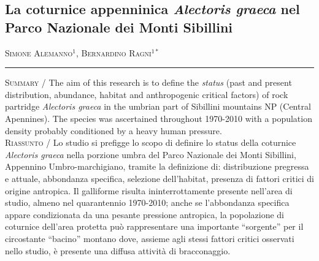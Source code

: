 \setcounter{figure}{0}
\setcounter{table}{0}

\begin{adjustwidth}{-3.5cm}{0cm}
\pagestyle{CIOpage}
\chapter*[La coturnice nel Parco Nazionale dei Sibillini]{La coturnice appenninica \textbf{\textit{Alectoris
graeca}}\textbf{ nel Parco Nazionale dei Monti Sibillini}}

\textsc{Simone Alemanno}$^{1}$, \textsc{Bernardino Ragni}$^{1*}$ \\

 
\noindent\color{MUSEBLUE}\rule{27cm}{2pt}
\vspace{1cm}
\end{adjustwidth}
{
\small
\noindent \textsc{\color{MUSEBLUE} Summary} / The aim of this research is to define the \textit{status} (past and
present distribution, abundance, habitat and anthropogenic critical
factors) of rock partridge \textit{Alectoris graeca} in the umbrian
part of Sibillini mountains NP (Central Apennines). The species was
ascertained throughout 1970-2010 with a population density probably
conditioned by a heavy human pressure. \\
\noindent \textsc{\color{MUSEBLUE} Riassunto} / Lo studio si prefigge lo scopo di definire lo status della coturnice
\textit{Alectoris graeca} nella porzione umbra del Parco Nazionale dei
Monti Sibillini, Appennino Umbro-marchigiano, tramite la definizione
di: distribuzione pregressa e attuale, abbondanza specifica, selezione
dell{\textquoteright}habitat, presenza di fattori critici di origine
antropica. Il galliforme risulta ininterrottamente presente
nell{\textquoteright}area di studio, almeno nel quarantennio 1970-2010;
anche se l{\textquoteright}abbondanza specifica appare condizionata da
una pesante pressione antropica, la popolazione di coturnice
dell{\textquoteright}area protetta pu\`o rappresentare una importante
{\textquotedblleft}sorgente{\textquotedblright} per il circostante
{\textquotedblleft}bacino{\textquotedblright} montano dove, assieme
agli stessi fattori critici osservati nello studio, \`e presente una
diffusa attivit\`a di bracconaggio. \\
}


